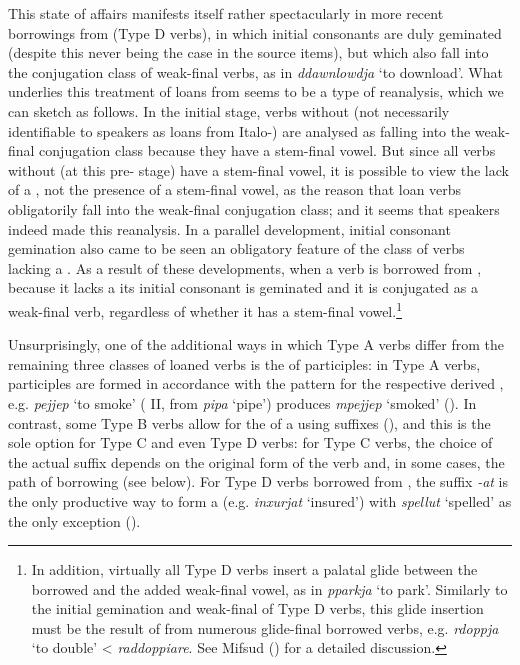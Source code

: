 \documentclass[output=paper]{langsci/langscibook}
\begin{document}
This state of affairs manifests itself rather spectacularly in more recent borrowings from  (Type D verbs), in which initial consonants are duly geminated (despite this never being the case in the  source items), but which also fall into the conjugation class of weak-final verbs, as in \textit{ddawnlowdja} `to download'. What underlies this treatment of loans from  seems to be a type of reanalysis, which we can sketch as follows. In the initial stage, verbs without  (not necessarily identifiable to speakers as loans from Italo-) are analysed as falling into the weak-final conjugation class because they have a stem-final vowel. But since all verbs without  (at this pre- stage) have a stem-final vowel, it is possible to view the lack of a , not the presence of a stem-final vowel, as the reason that loan verbs obligatorily fall into the weak-final conjugation class; and it seems that speakers indeed made this reanalysis. In a parallel development, initial consonant gemination also came to be seen an obligatory feature of the class of verbs lacking a . As a result of these developments, when a verb is borrowed from , because it lacks a  its initial consonant is geminated and it is conjugated as a weak-final verb, regardless of whether it has a stem-final vowel.\footnote{In addition, virtually all Type D verbs insert a palatal glide between the borrowed  and the added weak-final vowel, as in \textit{pparkja} `to park'. Similarly to the initial gemination and weak-final  of Type D verbs, this glide insertion must be the result of   from numerous glide-final borrowed  verbs, e.g. \textit{rdoppja} `to double' <  \textit{raddoppiare}. See Mifsud (\citeyear[225--236]{mifsudloanverbs}) for a detailed discussion.}

\label{participles} %
Unsurprisingly, one of the additional ways in which Type A verbs differ from the remaining three classes of loaned verbs is the  of  participles: in Type A verbs,  participles are formed in accordance with the  pattern for the respective derived , e.g. \textit{pejjep} `to smoke' ( II, from  \textit{pipa} `pipe') produces \textit{mpejjep} `smoked' (\citealt[70]{mifsudloanverbs}). In contrast, some Type B verbs allow for the  of a   using  suffixes (\citealt[127--133]{mifsudloanverbs}), and this is the sole option for Type C and even Type D verbs: for Type C verbs, the choice of the actual suffix depends on the original form of the verb and, in some cases, the path of borrowing (see below). For Type D verbs borrowed from , the suffix \textit{-at} is the only productive way to form a   (e.g. \textit{inxurjat} `insured') with \textit{spellut} `spelled' as the only exception (\citealt[248]{mifsudloanverbs}).
\end{document}
